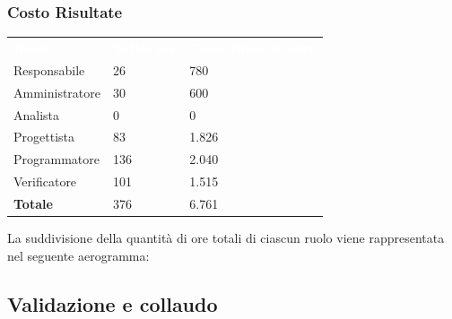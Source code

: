 \subsubsection{Costo Risultate}
{
	\renewcommand{\arraystretch}{2}
	\centering
	\begin{longtable}{ C{3cm} C{2cm} C{4cm}}
		\textcolor{white}{\textbf{Ruolo}} & \textcolor{white}{\textbf{Totale ore}} & \textcolor{white}{\textbf{Costo Ruolo in euro}}\\	
        
        Responsabile & 26 & 780 \\
        Amministratore & 30 & 600 \\
        Analista & 0 & 0 \\
        Progettista & 83 & 1.826 \\
        Programmatore & 136 & 2.040 \\
        Verificatore & 101 & 1.515\\
        \textbf{Totale} & 376 & 6.761 \\
		
	\end{longtable}
}

La suddivisione della quantità di ore totali di ciascun ruolo viene rappresentata nel seguente aerogramma:

\begin{figure}[h]
\end{figure}

\subsection{Validazione e collaudo}

